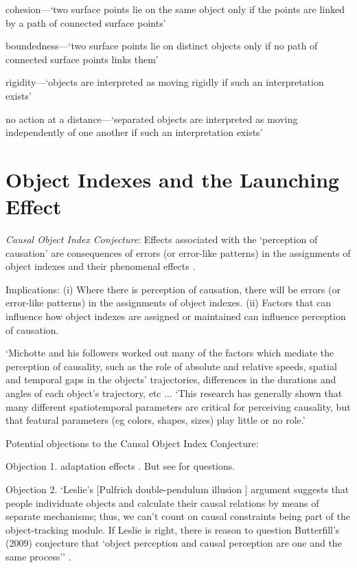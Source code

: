 \documentclass[12pt]{extarticle}
\begin{document}
\begin{multicols*}{3}
cohesion—‘two surface points lie on the same object only if the points are linked by a path of 
connected surface points’
 
boundedness—‘two surface points lie on distinct objects only if no path of connected surface points 
links them’
 
rigidity—‘objects are interpreted as moving rigidly if such an interpretation exists’
 
no action at a distance—‘separated objects are interpreted as moving independently of one another if such an 
interpretation exists’ \citep{Spelke:1990jn}
 

\section{Object Indexes and the Launching Effect}

\emph{Causal Object Index Conjecture}:
Effects associated with the ‘perception of causation’
are consequences of errors (or error-like patterns) in the assignments of object indexes and
their phenomenal effects \citep[compare][]{Krushke:1996ge}.


Implications:
(i) Where there is perception of causation, there will be errors (or error-like patterns)
in the assignments of object indexes.
(ii) Factors that can influence how object indexes are assigned or maintained can influence
perception of causation.



‘Michotte and his followers worked out many of the factors which mediate
the perception of causality, such as the role of absolute and relative
speeds, spatial and temporal gaps in the objects' trajectories, differences
in the durations and angles of each object's trajectory, etc ...
‘This research has generally shown that many different  spatiotemporal parameters are critical for perceiving causality, but  that featural parameters (eg colors, shapes, sizes) play little or no role.’
\citep[p.~456]{Scholl:2004dx}

Potential objections to the Causal Object Index Conjecture: 

Objection 1. adaptation effects \citep{rolfs:2013_visual}.
But see \citet{johnston:2013_causality,arnold:2015_objectcentered} for questions.

Objection 2. ‘Leslie’s [Pulfrich double-pendulum illusion \citep{wilson:1986_impossibly,Leslie:1988ct}] argument suggests
that people individuate objects and calculate their causal relations by
means of separate mechanisms; thus, we can’t count on causal constraints
being part of the object-tracking module. If Leslie is right, there is
reason to question Butterfill’s (2009) conjecture that ‘object
perception and causal perception are one and the same process’’ \citep[p.~421]{rips:2011_causation}.



\end{multicols*}
\end{document}

